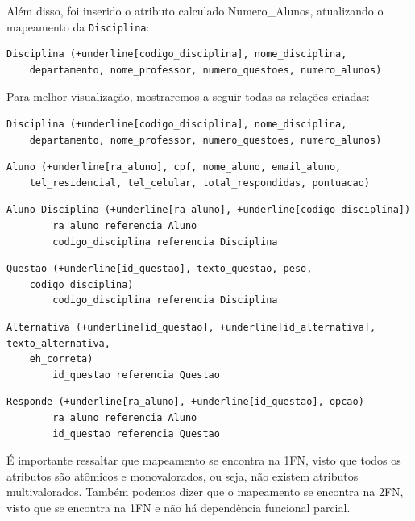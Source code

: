 \documentclass[12pt,a4paper]{article}
\begin{document}
Além disso, foi inserido o atributo calculado Numero\_Alunos, atualizando o mapeamento da \texttt{Disciplina}:

\begin{Verbatim}[commandchars=+\[\]]
    Disciplina (+underline[codigo_disciplina], nome_disciplina,
    departamento, nome_professor, numero_questoes, numero_alunos)
\end{Verbatim}

Para melhor visualização, mostraremos a seguir todas as relações criadas:\\

\begin{Verbatim}[commandchars=+\[\]]
    Disciplina (+underline[codigo_disciplina], nome_disciplina,
    departamento, nome_professor, numero_questoes, numero_alunos)
\end{Verbatim}

\begin{Verbatim}[commandchars=+\[\]]
    Aluno (+underline[ra_aluno], cpf, nome_aluno, email_aluno, 
    tel_residencial, tel_celular, total_respondidas, pontuacao)
\end{Verbatim}

\begin{Verbatim}[commandchars=+\[\]]
    Aluno_Disciplina (+underline[ra_aluno], +underline[codigo_disciplina])
        ra_aluno referencia Aluno
        codigo_disciplina referencia Disciplina
\end{Verbatim}

\begin{Verbatim}[commandchars=+\[\]]
    Questao (+underline[id_questao], texto_questao, peso,
    codigo_disciplina)
        codigo_disciplina referencia Disciplina
\end{Verbatim}

\begin{Verbatim}[commandchars=+\[\]]
    Alternativa (+underline[id_questao], +underline[id_alternativa], texto_alternativa, 
    eh_correta)
        id_questao referencia Questao
\end{Verbatim}

\begin{Verbatim}[commandchars=+\[\]]
    Responde (+underline[ra_aluno], +underline[id_questao], opcao)
        ra_aluno referencia Aluno
        id_questao referencia Questao
\end{Verbatim}

É importante ressaltar que mapeamento se encontra na 1FN, visto que todos os atributos são atômicos e monovalorados, ou seja, não existem atributos multivalorados. Também podemos dizer que o mapeamento se encontra na 2FN, visto que se encontra na 1FN e não há dependência funcional parcial.\\
\end{document}
